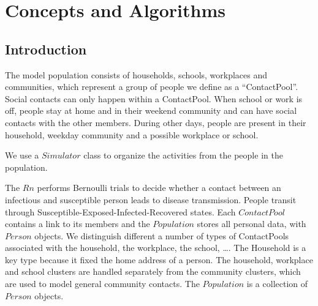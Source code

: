 \chapter{Concepts and Algorithms}
\label{chap:code}


\section{Introduction}
\label{section:ConceptsIntro}

The model population consists of households, schools, workplaces and
communities, which represent a group of people we define as a ``ContactPool''.
Social contacts can only happen within a ContactPool.
When school or work is off, people stay at home and in their weekend community and can have social contacts with the other members.
During other days, people are present in their household, weekday community
and a possible workplace or school.  

We use a $Simulator$ class to organize the activities from the people in the population.

The $Rn$ performs Bernoulli trials to decide whether a contact
between an infectious and susceptible person leads to disease transmission. 
People transit through Susceptible-Exposed-Infected-Recovered states.
Each $ContactPool$ contains a link to its members and the $Population$ stores all personal
data, with $Person$ objects. We distinguish different a number of types of ContactPools associated with the household, the workplace, 
the school, \ldots. The Household is a key type because it fixed the home address of a person.
The household, workplace and school clusters are handled separately from the
community clusters, which are used to model general community contacts. The
$Population$ is a collection of $Person$ objects.



